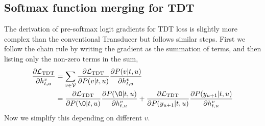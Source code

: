 \documentclass{article}
\begin{document}
\subsection{Softmax function merging for TDT}
The derivation of pre-softmax logit gradients for TDT loss is slightly more complex than the conventional Transducer but follows similar steps. First we follow the chain rule by writing the gradient as the summation of terms, and then listing only the  non-zero terms in the sum,
\begin{align}
\label{tdt_2_terms}
\begin{aligned}
    \frac{\partial{\mathcal{L}_\text{TDT}}}{\partial{h_{t, u}^v}} &= \sum_{v \in \mathcal{V}  } \frac{\partial{\mathcal{L}_\text{TDT}}}{\partial{P(v| t, u)}} \frac{\partial{P(v| t, u)}}{\partial{h_{t, u}^v}}  \\
    & = \frac{\partial{\mathcal{L}_\text{TDT}}}{\partial{P(\O| t, u)}} \frac{\partial{P(\O| t, u)}}{\partial{h_{t, u}^v}} + \frac{\partial{\mathcal{L}_\text{TDT}}}{\partial{P(y_{u+1}| t, u)}} \frac{\partial{P(y_{u+1}| t, u)}}{\partial{h_{t, u}^v}}
\end{aligned}
\end{align}
Now we simplify this depending on different $v$. 
\end{document}
